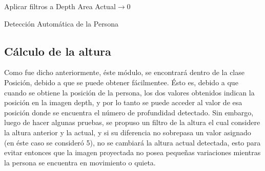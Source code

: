 \documentclass[a4paper,openright,12pt]{report}
\begin{document}
\begin{algorithm}[tbh]
	\SetAlgoLined
	Aplicar filtros a Depth\;
	Area Actual$\rightarrow$0\;
	
	
	\caption{Detección Automática de la Persona}
	\label{alg:deteccAutomatica}
\end{algorithm}
\subsection{Cálculo de la altura}
Como fue dicho anteriormente, éste módulo, se encontrará dentro de la clase Posición, debido a que se puede obtener fácilmentee. Ésto es, debido a que cuando se obtiene la posición de la persona, los dos valores obtenidos indican la posición en la imagen depth, y por lo tanto se puede acceder al valor de esa posición donde se encuentra el número de profundidad detectado. Sin embargo, luego de hacer algunas pruebas, se propuso un filtro de la altura el cual considere la altura anterior y la actual, y si su diferencia no sobrepasa un valor asignado (en éste caso se consideró 5), no se cambiará la altura actual detectada, esto para evitar entonces que la imagen proyectada no posea pequeñas variaciones mientras la persona se encuentra en movimiento o quieta.
\end{document}
